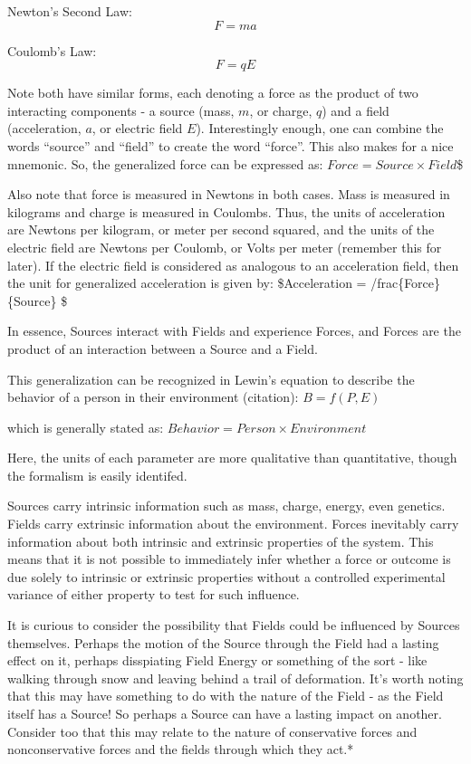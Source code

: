 \documentclass[
  letterpaper,
  DIV=11,
  numbers=noendperiod]{scrartcl}
\begin{document}
Newton's Second Law: \[F=ma\]

Coulomb's Law: \[F=qE\]

Note both have similar forms, each denoting a force as the product of
two interacting components - a source (mass, \(m\), or charge, \(q\))
and a field (acceleration, \(a\), or electric field \(E\)).
Interestingly enough, one can combine the words ``source'' and ``field''
to create the word ``force''. This also makes for a nice mnemonic. So,
the generalized force can be expressed as:
\(Force =Source\times Field\)\$

Also note that force is measured in Newtons in both cases. Mass is
measured in kilograms and charge is measured in Coulombs. Thus, the
units of acceleration are Newtons per kilogram, or meter per second
squared, and the units of the electric field are Newtons per Coulomb, or
Volts per meter (remember this for later). If the electric field is
considered as analogous to an acceleration field, then the unit for
generalized acceleration is given by: \$Acceleration =
/frac\{Force\}\{Source\} \$

In essence, Sources interact with Fields and experience Forces, and
Forces are the product of an interaction between a Source and a Field.

This generalization can be recognized in Lewin's equation to describe
the behavior of a person in their environment (citation): \(B=f(P,E)\)

which is generally stated as: \(Behavior =Person\times Environment\)

Here, the units of each parameter are more qualitative than
quantitative, though the formalism is easily identifed.

Sources carry intrinsic information such as mass, charge, energy, even
genetics. Fields carry extrinsic information about the environment.
Forces inevitably carry information about both intrinsic and extrinsic
properties of the system. This means that it is not possible to
immediately infer whether a force or outcome is due solely to intrinsic
or extrinsic properties without a controlled experimental variance of
either property to test for such influence.

It is curious to consider the possibility that Fields could be
influenced by Sources themselves. Perhaps the motion of the Source
through the Field had a lasting effect on it, perhaps disspiating Field
Energy or something of the sort - like walking through snow and leaving
behind a trail of deformation. It's worth noting that this may have
something to do with the nature of the Field - as the Field itself has a
Source! So perhaps a Source can have a lasting impact on another.
Consider too that this may relate to the nature of conservative forces
and nonconservative forces and the fields through which they act.*
\end{document}
